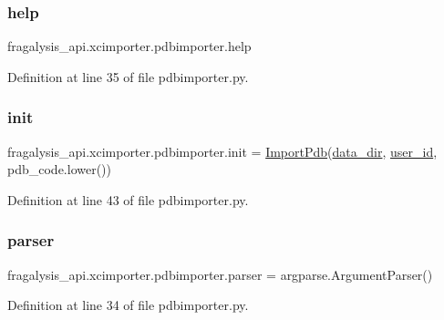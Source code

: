 \subsubsection{\texorpdfstring{help}{help}}
{\footnotesize\ttfamily fragalysis\+\_\+api.\+xcimporter.\+pdbimporter.\+help}



Definition at line 35 of file pdbimporter.\+py.

\mbox{\label{namespacefragalysis__api_1_1xcimporter_1_1pdbimporter_a3ad00a74050cce6bc31b2b0c736ba739}} 
\subsubsection{\texorpdfstring{init}{init}}
{\footnotesize\ttfamily fragalysis\+\_\+api.\+xcimporter.\+pdbimporter.\+init = \hyperlink{classfragalysis__api_1_1xcimporter_1_1pdbimporter_1_1_import_pdb}{Import\+Pdb}(\hyperlink{namespacefragalysis__api_1_1xcimporter_1_1pdbimporter_a1bf97f08674fecb515e86341fcdbd853}{data\+\_\+dir}, \hyperlink{namespacefragalysis__api_1_1xcimporter_1_1pdbimporter_a9cee2acc4fc991cee1a09431247027f9}{user\+\_\+id}, pdb\+\_\+code.\+lower())}



Definition at line 43 of file pdbimporter.\+py.

\mbox{\label{namespacefragalysis__api_1_1xcimporter_1_1pdbimporter_a5b23293cbebeaca77c09ce42825f5193}} 
\subsubsection{\texorpdfstring{parser}{parser}}
{\footnotesize\ttfamily fragalysis\+\_\+api.\+xcimporter.\+pdbimporter.\+parser = argparse.\+Argument\+Parser()}



Definition at line 34 of file pdbimporter.\+py.

